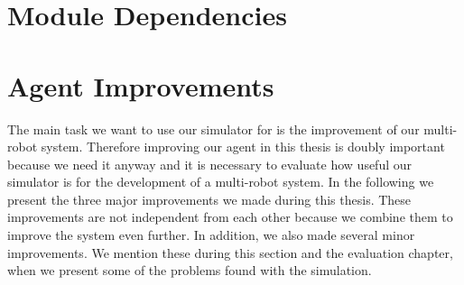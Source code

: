 \section{Module Dependencies}
\label{sec:module_dependencies}



\section{Agent Improvements}
\label{sec:agent_improvements}
The main task we want to use our simulator for is the improvement of our multi-robot system. Therefore improving our agent in this thesis is doubly important because we need it anyway and it is necessary to evaluate how useful our simulator is for the development of a multi-robot system. In the following we present the three major improvements we made during this thesis. These improvements are not independent from each other because we combine them to improve the system even further. In addition, we also made several minor improvements. We mention these during this section and the evaluation chapter, when we present some of the problems found with the simulation.


